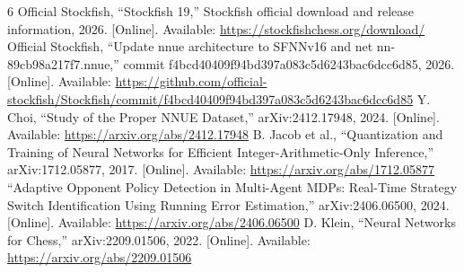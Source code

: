 \documentclass[conference]{IEEEtran}
\begin{document}
\begin{thebibliography}{6}
 Official Stockfish, ``Stockfish 19,'' Stockfish official download and release information, 2026. [Online]. Available: \url{https://stockfishchess.org/download/}
 Official Stockfish, ``Update nnue architecture to SFNNv16 and net nn-89cb98a217f7.nnue,'' commit f4bcd40409f94bd397a083c5d6243bac6dcc6d85, 2026. [Online]. Available: \url{https://github.com/official-stockfish/Stockfish/commit/f4bcd40409f94bd397a083c5d6243bac6dcc6d85}
 Y. Choi, ``Study of the Proper NNUE Dataset,'' arXiv:2412.17948, 2024. [Online]. Available: \url{https://arxiv.org/abs/2412.17948}
 B. Jacob et al., ``Quantization and Training of Neural Networks for Efficient Integer-Arithmetic-Only Inference,'' arXiv:1712.05877, 2017. [Online]. Available: \url{https://arxiv.org/abs/1712.05877}
 ``Adaptive Opponent Policy Detection in Multi-Agent MDPs: Real-Time Strategy Switch Identification Using Running Error Estimation,'' arXiv:2406.06500, 2024. [Online]. Available: \url{https://arxiv.org/abs/2406.06500}
 D. Klein, ``Neural Networks for Chess,'' arXiv:2209.01506, 2022. [Online]. Available: \url{https://arxiv.org/abs/2209.01506}
\end{thebibliography}
\end{document}
